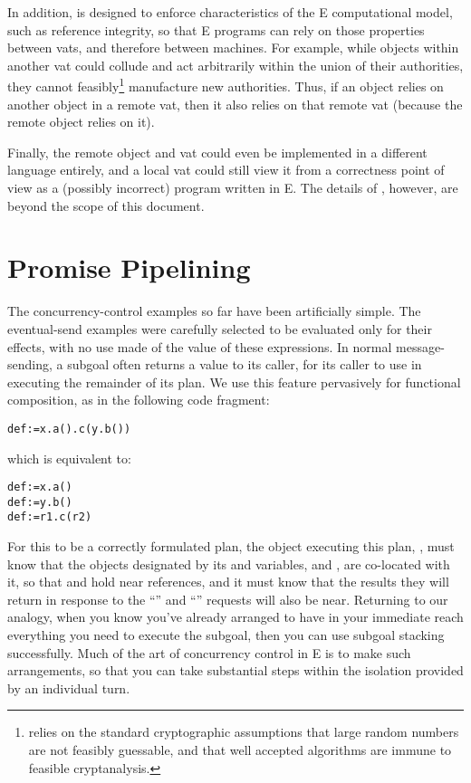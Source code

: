 \documentclass{llncs}
\begin{document}
In addition,  is designed to enforce characteristics of
the E computational model, such as reference integrity, so that E
programs can rely on those properties between vats, and therefore
between machines. For example, while objects within another vat could
collude and act arbitrarily within the union of their authorities,
they cannot feasibly\footnote{
%
 relies on the standard cryptographic assumptions that
large random numbers are not feasibly guessable, and that well
accepted algorithms are immune to feasible cryptanalysis.}
%
manufacture new authorities. Thus, if an object relies on another
object in a remote vat, then it also relies on that remote vat
(because the remote object relies on it).

Finally, the remote object and vat could even be implemented in a
different language entirely, and a local vat could still view it from
a correctness point of view as a (possibly incorrect) program written
in E.  The details of , however, are beyond the scope of
this document.


\section{Promise Pipelining}

The concurrency-control examples so far have been artificially
simple. The eventual-send examples were carefully selected to be
evaluated only for their effects, with no use made of the value of
these expressions. In normal message-sending, a subgoal often returns a
value to its caller, for its caller to use in executing the remainder
of its plan. We use this feature pervasively for functional
composition, as in the following code fragment:
%
\begin{alltt}
    def  := x.a().c(y.b())
\end{alltt}
%
which is equivalent to:
%
\begin{alltt}
    def  := x.a() 
    def  := y.b() 
    def  := r1.c(r2)
\end{alltt}
%
For this to be a correctly formulated plan, the object executing this
plan, , must know that the objects designated by its 
and  variables,  and , are co-located with it,
so that  and  hold near references, and it must know
that the results they will return in response to the ``''
and ``'' requests will also be near. Returning to our
analogy,  when you know you've already arranged
to have in your immediate reach everything you need to execute the
subgoal, then you can use subgoal stacking successfully. Much of the
art of concurrency control in E is to make such arrangements, so that
you can take substantial steps within the isolation provided by an
individual turn.
\end{document}
